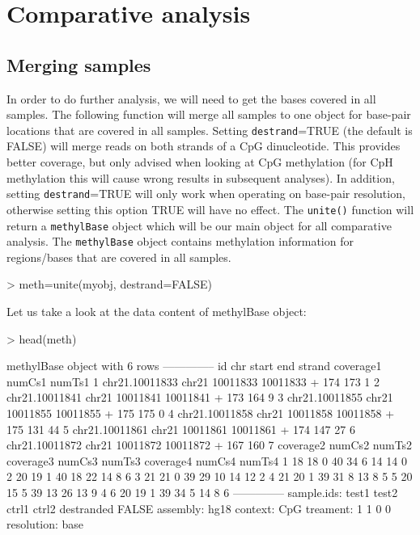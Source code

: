 \documentclass{article}
\begin{document}
\section{Comparative analysis}
\subsection{Merging samples}

In order to do further analysis, we will need to get the bases covered in all samples. The following function will merge all samples to one object for base-pair locations that are covered in all samples. Setting \texttt{destrand}=TRUE (the default is FALSE) will merge reads on both strands of a CpG dinucleotide. This provides better coverage, but only advised when looking at CpG methylation (for CpH methylation this will cause wrong results in subsequent analyses). In addition, setting \texttt{destrand}=TRUE will only work when operating on base-pair resolution, otherwise setting this option TRUE will have no effect. The \texttt{unite()} function will return a \texttt{methylBase} object which will be our main object for all comparative analysis. The \texttt{methylBase} object contains methylation information for regions/bases that are covered in all samples.
\begin{Schunk}
\begin{Sinput}
> meth=unite(myobj, destrand=FALSE)
\end{Sinput}
\end{Schunk}

Let us take a look at the data content of methylBase object:
\begin{Schunk}
\begin{Sinput}
> head(meth)
\end{Sinput}
\begin{Soutput}
methylBase object with 6 rows
--------------
              id   chr    start      end strand coverage1 numCs1 numTs1
1 chr21.10011833 chr21 10011833 10011833      +       174    173      1
2 chr21.10011841 chr21 10011841 10011841      +       173    164      9
3 chr21.10011855 chr21 10011855 10011855      +       175    175      0
4 chr21.10011858 chr21 10011858 10011858      +       175    131     44
5 chr21.10011861 chr21 10011861 10011861      +       174    147     27
6 chr21.10011872 chr21 10011872 10011872      +       167    160      7
  coverage2 numCs2 numTs2 coverage3 numCs3 numTs3 coverage4 numCs4 numTs4
1        18     18      0        40     34      6        14     14      0
2        20     19      1        40     18     22        14      8      6
3        21     21      0        39     29     10        14     12      2
4        21     20      1        39     31      8        13      8      5
5        20     15      5        39     13     26        13      9      4
6        20     19      1        39     34      5        14      8      6
--------------
sample.ids: test1 test2 ctrl1 ctrl2 
destranded FALSE 
assembly: hg18 
context: CpG 
treament: 1 1 0 0 
resolution: base 
\end{Soutput}
\end{Schunk}
\end{document}
